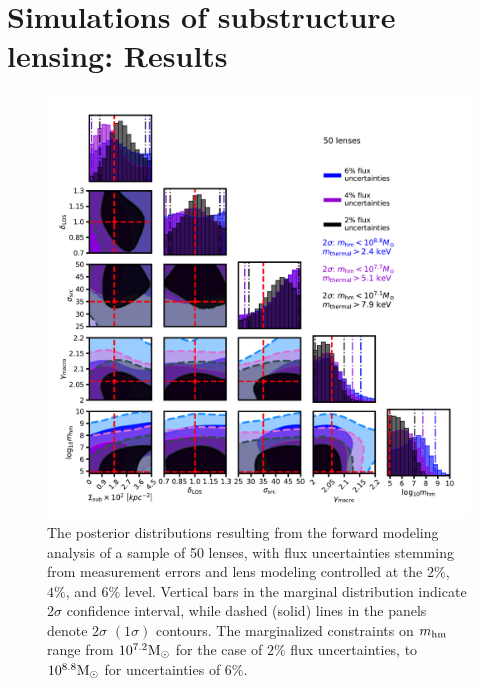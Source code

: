 \section{Simulations of substructure lensing: Results}
\label{sec:results}
\begin{figure}
	\includegraphics[clip,trim=0cm 0cm 0cm
	0cm,width=.9\textwidth,keepaspectratio]{./figures_LOSforward/CDM_full.pdf}
	\caption{\label{fig:CDM_1} The posterior distributions resulting from the forward modeling analysis of a sample of 50 lenses, with flux uncertainties stemming from measurement errors and lens modeling controlled at the $2\%$, $4\%$, and $6\%$ level. Vertical bars in the marginal distribution indicate $2 \sigma$ confidence interval, while dashed (solid) lines in the panels denote $2 \sigma$ $\left(1 \sigma\right)$ contours. The marginalized constraints on ${m_{\rm{hm}}}$ range from $10^{7.2} {\rm{M}_{\odot}}$ for the case of $2 \%$ flux uncertainties, to $10^{8.8} {\rm{M}_{\odot}}$ for uncertainties of $6 \%$.}
\end{figure}	

